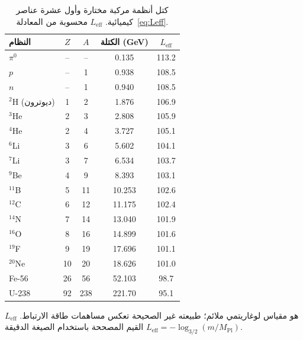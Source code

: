 \documentclass[11pt,a4paper]{article}
\begin{document}
	\begin{table}[H]
		\centering
		\caption{كتل أنظمة مركبة مختارة وأول عشرة عناصر كيميائية. \(L_{\mathrm{eff}}\) محسوبة من المعادلة~\eqref{eq:Leff}.}
		\label{tab:composite}
		\small
		\begin{tabular}{l c c c c}
			\toprule
			النظام & \(Z\) & \(A\) & الكتلة (GeV) & \(L_{\mathrm{eff}}\) \\
			\midrule
			\(\pi^0\) & – & – & 0.135 & 113.2 \\
			\(p\) & – & 1 & 0.938 & 108.5 \\
			\(n\) & – & 1 & 0.940 & 108.5 \\
			\(^2\)H (ديوترون) & 1 & 2 & 1.876 & 106.9 \\
			\(^3\)He & 2 & 3 & 2.808 & 105.9 \\
			\(^4\)He & 2 & 4 & 3.727 & 105.1 \\
			\(^6\)Li & 3 & 6 & 5.602 & 104.1 \\
			\(^7\)Li & 3 & 7 & 6.534 & 103.7 \\
			\(^9\)Be & 4 & 9 & 8.393 & 103.1 \\
			\(^{11}\)B & 5 & 11 & 10.253 & 102.6 \\
			\(^{12}\)C & 6 & 12 & 11.175 & 102.4 \\
			\(^{14}\)N & 7 & 14 & 13.040 & 101.9 \\
			\(^{16}\)O & 8 & 16 & 14.899 & 101.6 \\
			\(^{19}\)F & 9 & 19 & 17.696 & 101.1 \\
			\(^{20}\)Ne & 10 & 20 & 18.626 & 101.0 \\
			Fe-56 & 26 & 56 & 52.103 & 98.7 \\
			U-238 & 92 & 238 & 221.70 & 95.1 \\
			\bottomrule
		\end{tabular}
		\par\smallskip
		\footnotesize \(L_{\mathrm{eff}}\) هو مقياس لوغاريتمي ملائم؛ طبيعته غير الصحيحة تعكس مساهمات طاقة الارتباط. القيم المصححة باستخدام الصيغة الدقيقة \(L_{\mathrm{eff}} = -\log_{3/2}(m/M_{\mathrm{Pl}})\).
	\end{table}
	
\end{document}
